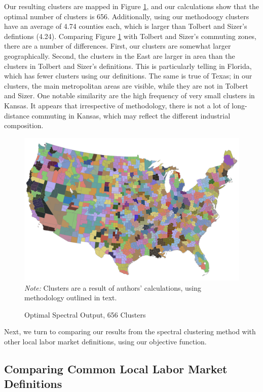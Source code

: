 Our resulting clusters are mapped in Figure \ref{fig:spectral}, and our calculations show that the optimal number of clusters is 656. Additionally, using our methodoogy clusters have an average of 4.74 counties each, which is larger than Tolbert and Sizer's defintions (4.24). Comparing Figure \ref{fig:spectral} with Tolbert and Sizer's commuting zones, there are a number of differences. First, our clusters are somewhat larger geographically. Second, the clusters in the East are larger in area than the clusters in Tolbert and Sizer's definitions. This is particularly telling in Florida, which has fewer clusters using our definitions. The same is true of Texas; in our clusters, the main metropolitan areas are visible, while they are not in Tolbert and Sizer. One notable similarity are the high frequency of very small clusters in Kansas. It appears that irrespective of methodology, there is not a lot of long-distance commuting in Kansas, which may reflect the different industrial composition.

\begin{figure}
\caption{Optimal Spectral Output, 656 Clusters\label{fig:spectral}}
\includegraphics[scale=.4]{./figures/optimal_spectral_par.png}
\footnotesize \emph{Note:} Clusters are a result of authors' calculations, using methodology outlined in text.
\end{figure}

Next, we turn to comparing our results from the spectral clustering method with other local labor market definitions, using our objective function.

\subsection{Comparing Common Local Labor Market Definitions}

